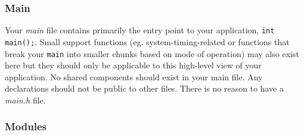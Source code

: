 \documentclass[10pt]{article}
\begin{document}
\subsubsection{Main}

Your \textit{main} file contains primarily the entry point to your application, \texttt{int main();}. Small support functions (eg. system-timing-related or functions that break your \texttt{main} into smaller chunks based on mode of operation) may also exist here but they should only be applicable to this high-level view of your application. No shared components should exist in your main file. Any declarations should not be public to other files. There is no reason to have a \textit{main.h} file. \\

\subsubsection{Modules}
\end{document}
